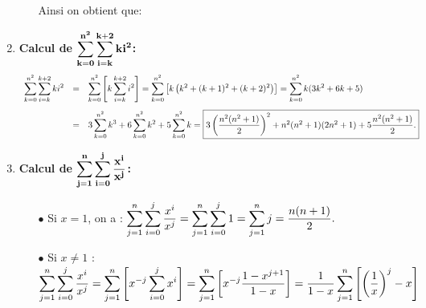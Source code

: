 \documentclass[a4paper, 11pt,reqno]{article}
\begin{document}
\begin{correction}
\begin{enumerate}
\begin{itemize}
Ainsi on obtient que: 
\end{itemize}
\item  \textbf{Calcul de $\mathbf{\displaystyle \sum\limits_{k=0}^{n^2}\displaystyle \sum\limits_{i=k}^{k+2} ki^2}$:}
$$\begin{array}{lll}
\ddp \sum\limits_{k=0}^{n^2}\ddp \sum\limits_{i=k}^{k+2} ki^2 &=& \ddp \sum\limits_{k=0}^{n^2} \left\lbrack k \ddp \sum\limits_{i=k}^{k+2} i^2 \right\rbrack
= \ddp \sum\limits_{k=0}^{n^2} \left\lbrack k \left(  k^2+(k+1)^2+(k+2)^2  \right) \right\rbrack
=\ddp \sum\limits_{k=0}^{n^2}  k (3k^2+6k+5)\vsec\\
&=& 3\ddp \sum\limits_{k=0}^{n^2} k^3  +6\ddp \sum\limits_{k=0}^{n^2} k^2+5\ddp \sum\limits_{k=0}^{n^2} k
=\fbox{$3\left(  \ddp\frac{ n^2(n^2+1) }{ 2 }  \right)^2+n^2(n^2+1)(2n^2+1)+5\ddp\frac{n^2(n^2+1)}{2} $.}\end{array}$$
\item  \textbf{Calcul de $\mathbf{\displaystyle \sum\limits_{j=1}^n\displaystyle \sum\limits_{i=0}^j \displaystyle\frac{ x^{i} }{  x^j }}$:}
\begin{itemize}
\item[$\bullet$] Si $x=1$, on a : $\displaystyle \sum\limits_{j=1}^n\displaystyle \sum\limits_{i=0}^j \displaystyle\frac{ x^{i} }{  x^j } = \sum\limits_{j=1}^n\displaystyle \sum\limits_{i=0}^j 1 = \sum\limits_{j=1}^n j = \frac{n(n+1)}{2}.$ 
\item[$\bullet$] Si $x\not= 1$ :
\noindent $\displaystyle \sum\limits_{j=1}^n\displaystyle \sum\limits_{i=0}^j \displaystyle\frac{ x^{i} }{  x^j }=\displaystyle \sum\limits_{j=1}^n\left\lbrack x^{-j} \displaystyle \sum\limits_{i=0}^j x^{i}  \right\rbrack=
\displaystyle \sum\limits_{j=1}^n\left\lbrack x^{-j}  \displaystyle\frac{1-x^{j+1}}{1-x}  \right\rbrack= \displaystyle\frac{1}{1-x}\displaystyle \sum\limits_{j=1}^n \left\lbrack \left( \displaystyle\frac{1}{x}\right)^j-x  \right\rbrack$
\begin{center}
\end{center}


\end{itemize}
\end{enumerate}
\end{correction}
\end{document}
